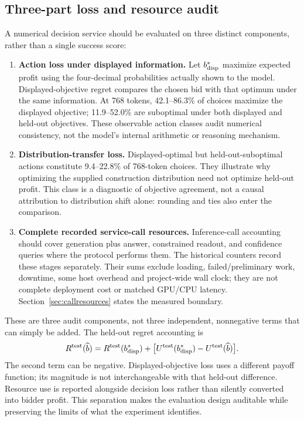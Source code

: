 \documentclass[sigconf,anonymous,nonacm]{acmart}
\begin{document}
\subsection{Three-part loss and resource audit}
A numerical decision service should be evaluated on three distinct components, rather than a single success score:
\begin{enumerate}
\item \textbf{Action loss under displayed information.} Let $b_{\rm disp}^*$ maximize expected profit using the four-decimal probabilities actually shown to the model. Displayed-objective regret compares the chosen bid with that optimum under the same information. At 768 tokens, 42.1--86.3\% of choices maximize the displayed objective; 11.9--52.0\% are suboptimal under both displayed and held-out objectives. These observable action classes audit numerical consistency, not the model's internal arithmetic or reasoning mechanism.
\item \textbf{Distribution-transfer loss.} Displayed-optimal but held-out-suboptimal actions constitute 9.4--22.8\% of 768-token choices. They illustrate why optimizing the supplied construction distribution need not optimize held-out profit. This class is a diagnostic of objective agreement, not a causal attribution to distribution shift alone: rounding and ties also enter the comparison.
\item \textbf{Complete recorded service-call resources.} Inference-call accounting should cover generation plus answer, constrained readout, and confidence queries where the protocol performs them. The historical counters record these stages separately. Their sums exclude loading, failed/preliminary work, downtime, some host overhead and project-wide wall clock; they are not complete deployment cost or matched GPU/CPU latency. Section~\ref{sec:callresources} states the measured boundary.
\end{enumerate}
These are three audit components, not three independent, nonnegative terms that can simply be added. The held-out regret accounting is
\[
R^{\rm test}(\widehat b)=R^{\rm test}(b_{\rm disp}^*)+
\bigl[U^{\rm test}(b_{\rm disp}^*)-U^{\rm test}(\widehat b)\bigr].
\]
The second term can be negative. Displayed-objective loss uses a different payoff function; its magnitude is not interchangeable with that held-out difference. Resource use is reported alongside decision loss rather than silently converted into bidder profit. This separation makes the evaluation design auditable while preserving the limits of what the experiment identifies.
\end{document}
